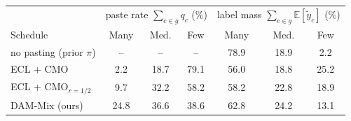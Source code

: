 \begin{tabular}{l ccc ccc}
\toprule
 & \multicolumn{3}{c}{paste rate $\sum_{c\in g} q_c$ (\%)} & \multicolumn{3}{c}{label mass $\sum_{c\in g}\mathbb{E}[\tilde y_c]$ (\%)} \\
Schedule & Many & Med. & Few & Many & Med. & Few \\
\midrule
no pasting (prior $\pi$) & -- & -- & -- & 78.9 & 18.9 & 2.2 \\
ECL + CMO & 2.2 & 18.7 & 79.1 & 56.0 & 18.8 & 25.2 \\
ECL + CMO$_{r=1/2}$ & 9.7 & 32.2 & 58.2 & 58.2 & 22.8 & 18.9 \\
DAM-Mix (ours) & 24.8 & 36.6 & 38.6 & 62.8 & 24.2 & 13.1 \\
\bottomrule
\end{tabular}
